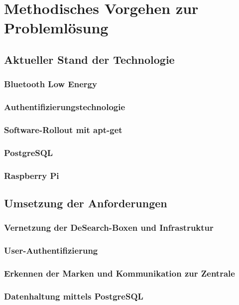 \section{Methodisches Vorgehen zur Problemlösung}

\subsection{Aktueller Stand der Technologie}

\subsubsection{Bluetooth Low Energy}\label{sssec:BLE}
\subsubsection{Authentifizierungstechnologie}
\subsubsection{Software-Rollout mit apt-get}
\subsubsection{PostgreSQL}
\subsubsection{Raspberry Pi}

\subsection{Umsetzung der Anforderungen}

\subsubsection{Vernetzung der DeSearch-Boxen und Infrastruktur}
\subsubsection{User-Authentifizierung}
\subsubsection{Erkennen der Marken und Kommunikation zur Zentrale}
\subsubsection{Datenhaltung mittels PostgreSQL}
